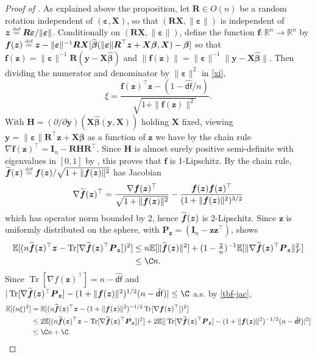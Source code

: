 \documentclass[11pt]{amsart}
\numberwithin{equation}{section}
\numberwithin{equation}{section}
\def\real{{\mathbb{R}}}
\def\R{{\real}}
\def\E{{\mathbb{E}}}
\DeclareMathOperator{\trace}{Tr}
\def\mathbold{\boldsymbol} %
\def\bff{\mathbold{f}}\def\fhat{\widehat{f}}\def\hf{\widehat{f}}\def\ftil{\widetilde{f}}
\def\bH{{\mathbold{H}}}\def\calH{{\cal H}}\def\scrH{{\mathscr H}}\def\Hhat{\widehat{H}}\def\Htil{{\widetilde H}}
\def\bI{\mathbold{I}}\def\hbI{{\widehat{\bI}}}\def\tbI{{\widetilde{\bI}}}
\def\bP{\mathbold{P}}\def\hbP{{\widehat{\bP}}}\def\tbP{{\widetilde{\bP}}}
\def\bR{\mathbold{R}}\def\hbR{{\widehat{\bR}}}\def\tbR{{\widetilde{\bR}}}
\def\bX{\mathbold{X}}\def\hbX{{\widehat{\bX}}}\def\tbX{{\widetilde{\bX}}}\def\bXbar{{\overline \bX}}
\def\by{\mathbold{y}}\def\yhat{\widehat{y}}\def\ytil{\widetilde{y}}\def\ybar{{\overline y}}\def\vby{{\bf y}}
\def\bz{\mathbold{z}}\def\zhat{\widehat{z}}\def\ztil{\widetilde{z}}\def\zbar{{\overline z}}
\def\bbeta{\mathbold{\beta}}\def\betahat{\widehat{\beta}}\def\hbeta{\widehat{\beta}}
\def\hbbeta{{{\widehat{\bbeta}}}}
\def\ep{\varepsilon}\def\eps{\epsilon}\def\veps{\varepsilon}
\def\bep{ {\mathbold{\ep} }}
\def\defas{\stackrel{\text{\tiny def}}{=}}
\def\df{{\hat{\mathsf{df}}}{}}
\begin{document}
\begin{proof}[Proof of ]
    As explained above the proposition, let $\bR\in O(n)$
    be a random rotation independent of $(\bep,\bX)$, so that
    $(\bR\bX,\|\bep\|)$ is independent of $\bz\defas \bR\bep /\|\bep\|$.
    Conditionally on $(\bR\bX,\|\bep\|)$, define the function
    $\bff:\R^n\to\R^n$ by
    $\bff(\bz) \defas \bz-\|\bep\|^{-1}\bR\bX[\hbbeta(\|\bep\|\bR^\top\bz + \bX\bbeta,\bX)-\bbeta]$
    so that $\bff(\bz)=\|\bep\|^{-1}\bR(\by-\bX\hbbeta)$
    and $\|\bff(\bz)\| = \|\bep\|^{-1}\|\by-\bX\hbbeta\|$.
    Then dividing the numerator and denominator by $\|\bep\|^2$ in
    \eqref{xi},
    $$
    \xi = \frac{\bff(\bz)^\top\bz  - (1-\df/n)}{
        \sqrt{ 1+ \|\bff(\bz)\|^2}
    }.
    $$
    With $\bH = (\partial/\partial\by)(\bX\hbbeta(\by,\bX))$ holding $\bX$ fixed, viewing $\by = \|\bep\|\bR^\top\bz + \bX\bbeta$
    as a function of $\bz$ we have
    by the chain rule
    $\nabla \bff(\bz)^\top = \bI_n - \bR\bH\bR^\top$.
    Since $\bH$ is almost surely positive semi-definite
    with eigenvalues in $[0,1]$ by ,
    this proves that $\bff$ is 1-Lipschitz.
    By the chain rule,
    $\tbf(\bz) \defas \bff(\bz)/\sqrt{1+\|\bff(\bz)\|^2}$ 
    has Jacobian
    \begin{equation}
    \nabla \tbf(\bz)^\top
    = \frac{\nabla \bff(\bz)^\top}{\sqrt{1+\|\bff(\bz)\|^2}}
    - \frac{\bff(\bz)\bff(\bz)^\top}{(1+\|\bff(\bz)\|^2)^{3/2}}
    \label{tbf-jac}
    \end{equation}
    which has operator norm bounded by 2, hence $\tbf(\bz)$ is 2-Lipschitz.
    Since $\bz$ is uniformly distributed on the sphere,
    with $\bP_{\bz} = (\bI_n - \bz\bz^\top)$, \cite[Lemma B.1]{bellec2021asymptotic} shows
    \begin{align*}
    \E[(n \tbf(\bz)^\top\bz - \trace[\nabla \tbf(\bz)^\top\bP_{\bz}])^2]
    &\le n \E[\|\tbf(\bz)\|^2] + (1-\tfrac{2}{n})^{-1}\E[\|\nabla \tbf(\bz)^\top\bP_{\bz}\|_F^2]
  \\&\le \C n.
    \end{align*}
    Since 
    $\trace[\nabla f(\bz)^\top]=n-\df$ and
    $|\trace[\nabla \tbf(\bz)^\top\bP_{\bz}]-(1+\|\bff(\bz)\|^2)^{1/2}(n-\df)|
    \le
    \C
    $ a.s. by \eqref{tbf-jac},
    \begin{align*}
        \E[(n\xi)^2]
        &=
    \E[(
    n\tbf(\bz)^\top\bz - (1+\|\bff(\bz)\|^2)^{-1/2}\trace[\nabla \bff(\bz)^\top])^2]
      \\&\le
    2\E[(n \tbf(\bz)^\top\bz - \trace[\nabla \tbf(\bz)^\top\bP_{\bz}])^2]
    + 2
    \E[
    |\trace[\nabla \tbf(\bz)^\top\bP_{\bz}]-(1+\|\bff(\bz)\|^2)^{-1/2}(n-\df)|^2
    ]
      \\&\le \C n + \C.
    \end{align*}
\end{proof}
\end{document}
